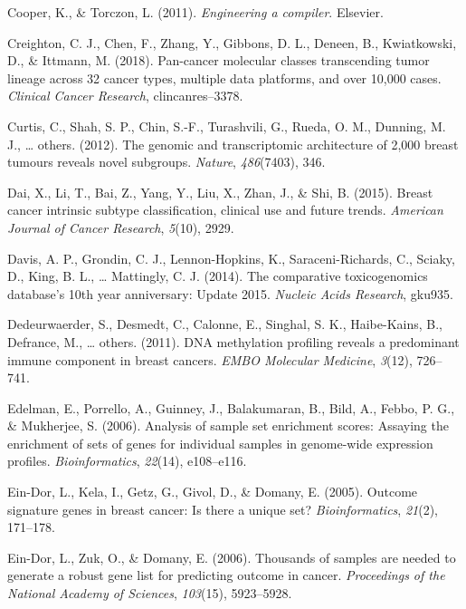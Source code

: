 \documentclass[12pt,twoside]{reedthesis}
\begin{document}
\leavevmode\hypertarget{ref-cooper2011engineering}{}%
Cooper, K., \& Torczon, L. (2011). \emph{Engineering a compiler}. Elsevier.

\leavevmode\hypertarget{ref-creighton2018pan}{}%
Creighton, C. J., Chen, F., Zhang, Y., Gibbons, D. L., Deneen, B., Kwiatkowski, D., \& Ittmann, M. (2018). Pan-cancer molecular classes transcending tumor lineage across 32 cancer types, multiple data platforms, and over 10,000 cases. \emph{Clinical Cancer Research}, clincanres--3378.

\leavevmode\hypertarget{ref-curtis2012genomic}{}%
Curtis, C., Shah, S. P., Chin, S.-F., Turashvili, G., Rueda, O. M., Dunning, M. J., \ldots{} others. (2012). The genomic and transcriptomic architecture of 2,000 breast tumours reveals novel subgroups. \emph{Nature}, \emph{486}(7403), 346.

\leavevmode\hypertarget{ref-dai2015breast}{}%
Dai, X., Li, T., Bai, Z., Yang, Y., Liu, X., Zhan, J., \& Shi, B. (2015). Breast cancer intrinsic subtype classification, clinical use and future trends. \emph{American Journal of Cancer Research}, \emph{5}(10), 2929.

\leavevmode\hypertarget{ref-davis2014comparative}{}%
Davis, A. P., Grondin, C. J., Lennon-Hopkins, K., Saraceni-Richards, C., Sciaky, D., King, B. L., \ldots{} Mattingly, C. J. (2014). The comparative toxicogenomics database's 10th year anniversary: Update 2015. \emph{Nucleic Acids Research}, gku935.

\leavevmode\hypertarget{ref-dedeurwaerder2011dna}{}%
Dedeurwaerder, S., Desmedt, C., Calonne, E., Singhal, S. K., Haibe-Kains, B., Defrance, M., \ldots{} others. (2011). DNA methylation profiling reveals a predominant immune component in breast cancers. \emph{EMBO Molecular Medicine}, \emph{3}(12), 726--741.

\leavevmode\hypertarget{ref-edelman2006analysis}{}%
Edelman, E., Porrello, A., Guinney, J., Balakumaran, B., Bild, A., Febbo, P. G., \& Mukherjee, S. (2006). Analysis of sample set enrichment scores: Assaying the enrichment of sets of genes for individual samples in genome-wide expression profiles. \emph{Bioinformatics}, \emph{22}(14), e108--e116.

\leavevmode\hypertarget{ref-ein2005outcome}{}%
Ein-Dor, L., Kela, I., Getz, G., Givol, D., \& Domany, E. (2005). Outcome signature genes in breast cancer: Is there a unique set? \emph{Bioinformatics}, \emph{21}(2), 171--178.

\leavevmode\hypertarget{ref-ein2006thousands}{}%
Ein-Dor, L., Zuk, O., \& Domany, E. (2006). Thousands of samples are needed to generate a robust gene list for predicting outcome in cancer. \emph{Proceedings of the National Academy of Sciences}, \emph{103}(15), 5923--5928.
\end{document}
